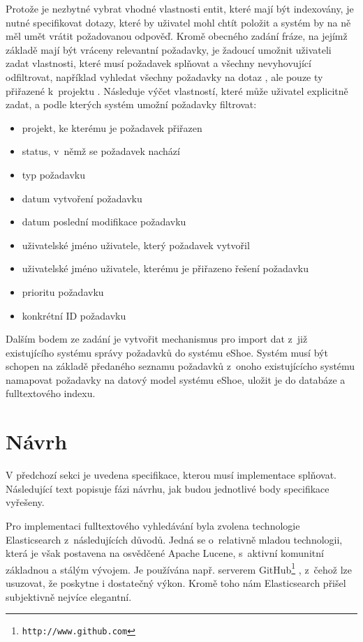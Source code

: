 \documentclass[11pt,oneside]{fithesis2}
\begin{document}
Protože je nezbytné vybrat vhodné vlastnosti entit, které mají být indexovány, je nutné specifikovat dotazy, které by uživatel mohl chtít položit a systém by na ně měl umět vrátit požadovanou odpověď. Kromě obecného zadání fráze, na jejímž základě mají být vráceny relevantní požadavky, je žadoucí umožnit uživateli zadat vlastnosti, které musí požadavek splňovat a všechny nevyhovující odfiltrovat, například vyhledat všechny požadavky na dotaz , ale pouze ty přiřazené k~projektu . Následuje výčet vlastností, které může uživatel explicitně zadat, a podle kterých systém umožní požadavky filtrovat:
\begin{itemize}
	\item projekt, ke kterému je požadavek přiřazen
	\item status, v~němž se požadavek nachází
	\item typ požadavku
	\item datum vytvoření požadavku
	\item datum poslední modifikace požadavku
	\item uživatelské jméno uživatele, který požadavek vytvořil
	\item uživatelské jméno uživatele, kterému je přiřazeno řešení požadavku
	\item prioritu požadavku
	\item konkrétní ID požadavku	 
\end{itemize}

Dalším bodem ze zadání je vytvořit mechanismus pro import dat z~již existujícího systému správy požadavků do systému eShoe. Systém musí být schopen na základě předaného seznamu požadavků z~onoho existujícícho systému namapovat požadavky na datový model systému eShoe, uložit je do databáze a fulltextového indexu.

\section{Návrh}
V předchozí sekci je uvedena specifikace, kterou musí implementace splňovat. Následující text popisuje fázi návrhu, jak budou jednotlivé body specifikace vyřešeny. 

Pro implementaci fulltextového vyhledávání byla zvolena technologie Elasticsearch z~následujících důvodů. Jedná se o~relativně mladou technologii, která je však postavena na osvědčené Apache Lucene, s~aktivní komunitní základnou a stálým vývojem. Je používána např. serverem GitHub\footnote{\texttt{http://www.github.com}} \cite{ElasticsearchDefinitiveGuide}, z~čehož lze usuzovat, že poskytne i dostatečný výkon. Kromě toho nám Elasticsearch přišel subjektivně nejvíce elegantní.
\end{document}

